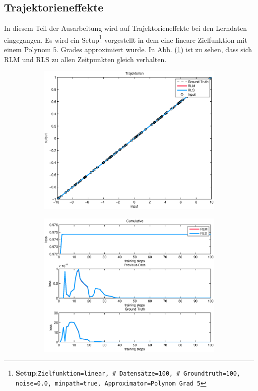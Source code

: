 \documentclass[a4paper, 12pt]{article}
\begin{document}
{\subsection{Trajektorieneffekte}
\label{sec:perf:trajektorien}
In diesem Teil der Ausarbeitung wird auf Trajektorieneffekte bei den Lerndaten eingegangen. Es wird ein Setup\footnote{\textbf{Setup}:\quad\texttt{Zielfunktion=linear, \# Datensätze=100, \# Groundtruth=100, noise=0.0, minpath=true, Approximator=Polynom Grad 5}} vorgestellt in dem eine lineare Zielfunktion mit einem Polynom 5. Grades approximiert wurde. In Abb. (\ref{fig:perf:trajektorien5:approx}) ist zu sehen, dass sich RLM und RLS zu allen Zeitpunkten gleich verhalten.
\begin{figure}[H]
        \centering
        \begin{subfigure}[b]{0.4\textwidth}
                \centering
                \includegraphics[width=\textwidth]{./images/copyofstats/trajektorien5_approx_100.eps}
                \caption{}
                \label{fig:perf:trajektorien5:approx}
        \end{subfigure}
        \begin{subfigure}[b]{0.4\textwidth}
                \centering
                \includegraphics[width=\textwidth]{./images/copyofstats/trajektorien5_perf_100.eps}

\end{subfigure}
\end{figure}}
\end{document}
